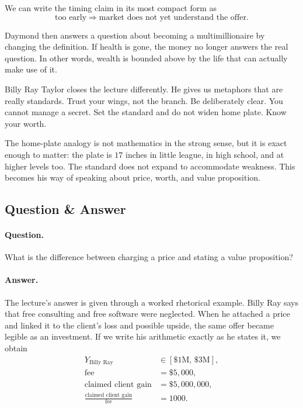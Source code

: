 We can write the timing claim in its most compact form as
\begin{equation}
\text{too early} \Rightarrow \text{market does not yet understand the offer}.
\end{equation}

Daymond then answers a question about becoming a multimillionaire by changing the definition. If health is gone, the money no longer answers the real question. In other words, wealth is bounded above by the life that can actually make use of it.

Billy Ray Taylor closes the lecture differently. He gives us metaphors that are really standards. Trust your wings, not the branch. Be deliberately clear. You cannot manage a secret. Set the standard and do not widen home plate. Know your worth.

The home-plate analogy is not mathematics in the strong sense, but it is exact enough to matter: the plate is \(17\) inches in little league, in high school, and at higher levels too. The standard does not expand to accommodate weakness. This becomes his way of speaking about price, worth, and value proposition.

\subsection{Question \& Answer}

\paragraph{Question.} What is the difference between charging a price and stating a value proposition?

\paragraph{Answer.} The lecture's answer is given through a worked rhetorical example. Billy Ray says that free consulting and free software were neglected. When he attached a price and linked it to the client's loss and possible upside, the same offer became legible as an investment. If we write his arithmetic exactly as he states it, we obtain
\begin{align}
Y_{\text{Billy Ray}} &\in [\$1\text{M},\,\$3\text{M}],\\
\text{fee} &= \$5{,}000,\\
\text{claimed client gain} &= \$5{,}000{,}000,\\
\frac{\text{claimed client gain}}{\text{fee}} &= 1000.
\end{align}

